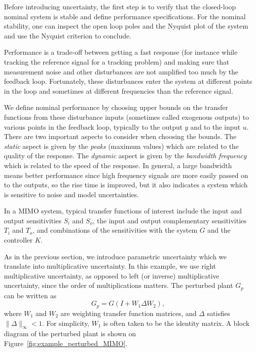 \documentclass[12pt,lot, lof]{puthesis}
\begin{document}

Before introducing uncertainty, the first step is to verify that the closed-loop nominal system is stable and define performance specifications.
For the nominal stability, one can inspect the open loop poles and the Nyquist plot of the system and use the Nyquist criterion to conclude.


Performance is a trade-off between getting a fast response (for instance while tracking the reference signal for a tracking problem) and making sure that measurement noise and other disturbances are not amplified too much by the feedback loop.
Fortunately, these disturbances enter the system at different points in the loop and sometimes at different frequencies than the reference signal.

We define nominal performance by choosing upper bounds on the transfer functions from these disturbance inputs (sometimes called exogenous outputs) to various points in the feedback loop, typically to the output $y$ and to the input $u$.
There are two important aspects to consider when choosing the bounds.
The \emph{static} aspect is given by the \emph{peaks} (maximum values) which are related to the quality of the response.
The \emph{dynamic} aspect is given by the \emph{bandwidth frequency} which is related to the speed of the response.
In general, a large bandwidth means better performance since high frequency signals are more easily passed on to the outputs, so the rise time is improved, but it also indicates a system which is sensitive to noise and model uncertainties.

In a MIMO system, typical transfer functions of interest include the input and output sensitivities $S_i$ and $S_o$, the input and output complementary sensitivities $T_i$ and $T_o$, and combinations of the sensitivities with the system $G$ and the controller $K$.


As in the previous section, we introduce parametric uncertainty which we translate into multiplicative uncertainty.
In this example, we use right multiplicative uncertainty, as opposed to left (or inverse) multiplicative uncertainty, since the order of multiplications matters.
The perturbed plant $G_p$ can be written as
\begin{equation} \label{eq:multiplicative_MIMO}
	G_p = G (I + W_1 \Delta W_2),
\end{equation}
where $W_1$ and $W_2$ are weighting transfer function matrices, and $\Delta$ satisfies $\|\Delta\|_\infty < 1$.
For simplicity, $W_1$ is often taken to be the identity matrix.
A block diagram of the perturbed plant is shown on Figure~\ref{fig:example_perturbed_MIMO}.
\end{document}
